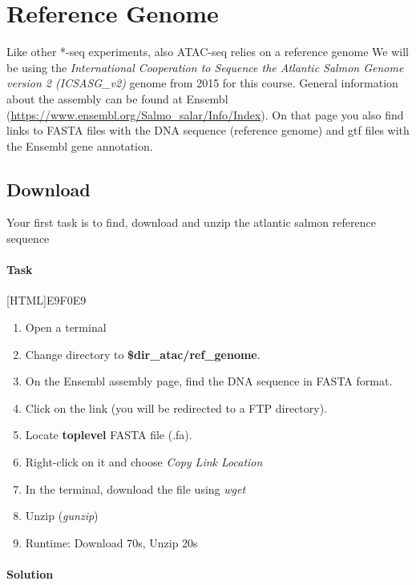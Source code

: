 \documentclass[12pt]{article}
\begin{document}
	\section{Reference Genome}
		Like other *-seq experiments, also ATAC-seq relies on a reference genome
		We will be using the \textit{ International Cooperation to Sequence the Atlantic Salmon Genome  version 2 (ICSASG\_v2)} genome from 2015 for this course. 
		General information about the assembly can be found at Ensembl (\url{https://www.ensembl.org/Salmo_salar/Info/Index}).
		On that page you also find links to FASTA files with the DNA sequence (reference genome) and gtf files with the Ensembl gene annotation.
		
		\subsection{Download}
			Your first task is to find, download and unzip the atlantic salmon reference sequence
			
			\paragraph{Task}
			
				[HTML]{E9F0E9}{\parbox{\linewidth}{%
					\begin{enumerate}
						\item Open a terminal
						\item Change directory to \textbf{\$dir\_atac/ref\_genome}.
						\item On the Ensembl assembly page, find the DNA sequence in FASTA format.
						\item Click on the link (you will be redirected to a FTP directory).
						\item Locate  \textbf{toplevel}  FASTA file (.fa).
						\item Right-click on it and choose \textit{Copy Link Location}
						\item In the terminal, download the file using \textit{wget}
						\item Unzip (\textit{gunzip})
						\item Runtime: Download 70s, Unzip 20s
					\end{enumerate}
				}}
			
			\paragraph{Solution}
			
\end{document}

